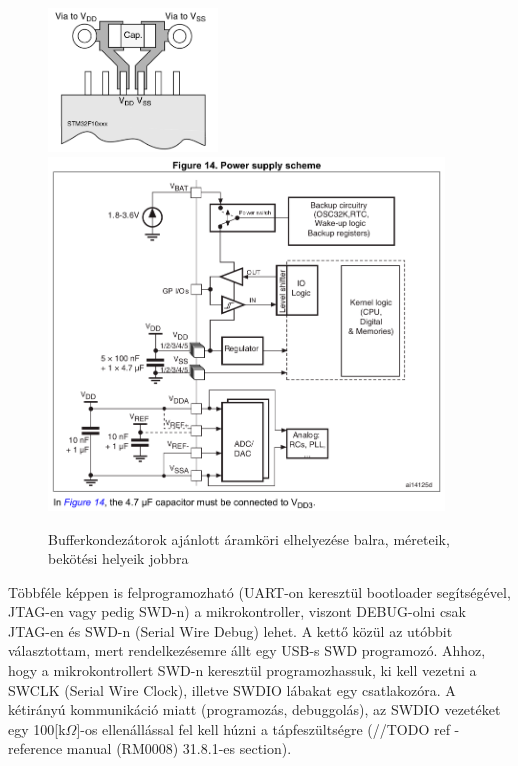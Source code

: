 \documentclass[../main.tex]{subfiles}
\begin{document}
            \begin{figure}[h!]
                \centering
                    \includegraphics[width=4.5cm]{resources/pcb_res/decoup_cap.png}
                    \includegraphics[width=10.5cm]{resources/pcb_res/power_sup_capacitors.png}
                \caption{Bufferkondezátorok ajánlott áramköri elhelyezése balra, méreteik, bekötési helyeik jobbra}
                \label{fig:decoupling_cap}
            \end{figure}
            
            
            Többféle képpen is felprogramozható (UART-on keresztül bootloader segítségével, JTAG-en vagy pedig SWD-n) a mikrokontroller, viszont DEBUG-olni csak JTAG-en és SWD-n (Serial Wire Debug) lehet. A kettő közül az utóbbit választottam, mert rendelkezésemre állt egy USB-s SWD programozó. Ahhoz, hogy a mikrokontrollert SWD-n keresztül programozhassuk, ki kell vezetni a SWCLK (Serial Wire Clock), illetve SWDIO lábakat egy csatlakozóra. A kétirányú kommunikáció miatt (programozás, debuggolás), az SWDIO vezetéket egy 100[k$\Omega$]-os ellenállással fel kell húzni a tápfeszültségre (//TODO ref - reference manual (RM0008) 31.8.1-es section). 
            
\end{document}
